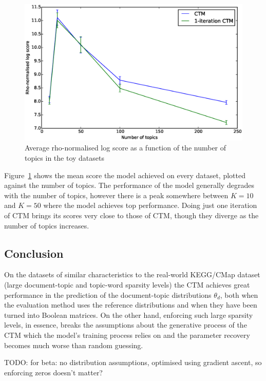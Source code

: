 \documentclass[12pt,a4paper,twoside,openright]{report}
\begin{document}
\begin{figure}[!htb]
\includegraphics[width=\textwidth]{sim-average-rho.eps}
\caption{Average rho-normalised log score as a function of the number of topics in the toy datasets}
\label{fig:sim-average-rho}
\end{figure}

Figure~\ref{fig:sim-average-rho} shows the mean score the model achieved on every dataset, plotted against the number of topics. The performance of the model generally degrades with the number of topics, however there is a peak somewhere between $K=10$ and $K=50$ where the model achieves top performance. Doing just one iteration of CTM brings its scores very close to those of CTM, though they diverge as the number of topics increases.

\subsection{Conclusion}

On the datasets of similar characteristics to the real-world KEGG/CMap dataset (large document-topic and topic-word sparsity levels) the CTM achieves great performance in the prediction of the document-topic distributions $\theta_d$, both when the evaluation method uses the reference distributions and when they have been turned into Boolean matrices. On the other hand, enforcing such large sparsity levels, in essence, breaks the assumptions about the generative process of the CTM which the model's training process relies on and the parameter recovery becomes much worse than random guessing.

TODO: for beta: no distribution assumptions, optimised using gradient ascent, so enforcing zeros doesn't matter?
\end{document}
